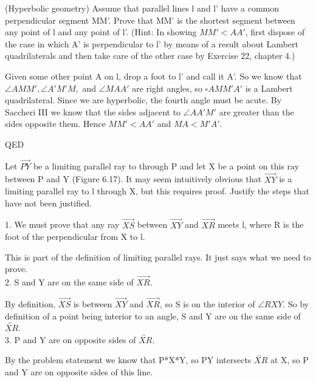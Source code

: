 \documentclass[12pt,letterpaper]{article}
\newcommand{\Proof}{\noindent {\bf Proof: }}
\newcommand{\QED}{\begin{flushright}QED\end{flushright}}
\newcommand{\prob}[1]{\newpage\noindent {\bf #1}}
\begin{document}
\prob{3 }(Hyperbolic geometry)
Assume that parallel lines l and l' have a common perpendicular segment MM'.  Prove that MM'  is the shortest segment between any point of l and any point of l'.  (Hint: In showing $MM' < AA'$, first dispose of the case in which A' is perpendicular to l' by means of a result about Lambert quadrilaterals and then take care of the other case by Exercise 22, chapter 4.)

\Proof

Given some other point A on l, drop a foot to l' and call it A'.  So we know that $\angle AMM', \angle A'M'M,$ and $\angle MAA'$ are right angles, so $\square AMM'A'$ is a Lambert quadrilateral.  Since we are hyperbolic, the fourth angle must be acute.  By Saccheri III we know that the sides adjacent to $\angle AA'M'$ are greater than the sides opposite them.  Hence $MM' < AA'$ and $MA < M'A'$.

\QED






\prob{6 }Let $\overrightarrow{PY}$ be a limiting parallel ray to  through P and let X be a point on this ray between P and Y (Figure 6.17).  It may seem intuitively obvious that $\overrightarrow{XY}$ is a limiting parallel ray to l through X, but this requires proof.  Justify the steps that have not been justified. 

1. We must prove that any ray $\overrightarrow{XS}$ between $\overrightarrow{XY}$ and $\overrightarrow{XR}$ meets l, where R is the foot of the perpendicular from X to l. 

This is part of the definition of limiting parallel rays.  It just says what we need to prove.\\



2. S and Y are on the same side of $\overrightarrow{XR}$.  

By definition, $\overrightarrow{XS}$ is between $\overrightarrow{XY}$ and $\overrightarrow{XR}$, so S is on the interior of $\angle RXY$.  So by definition of a point being interior to an angle, S and Y are on the same side of $\overleftrightarrow{XR}$. \\


3. P and Y are on opposite sides of $\overleftrightarrow{XR}$. 

By the problem statement we know that P*X*Y, so PY intersects $\overleftrightarrow{XR}$ at X, so P and Y are on opposite sides of this line.\\
\end{document}
